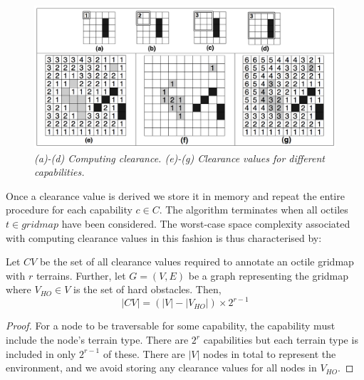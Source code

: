 \begin{figure}[htbp]
	\vspace{-9pt}
       \caption{\emph{(a)-(d) Computing clearance. (e)-(g) Clearance values for different capabilities.}}
       \begin{center}
                       \includegraphics[scale=0.20, trim = 20mm 9mm 20mm 0mm]{diagrams/annotations.png}
       \end{center}
       \label{aha-fig:annotations}
	\vspace{-6pt}
\end{figure}

Once a clearance value is derived we store it in memory and repeat the entire procedure for each capability $c \in C$.  
The algorithm terminates when all octiles $t \in gridmap$ have been considered. 
The worst-case space complexity associated with computing clearance values in this fashion is thus characterised by: 
\begin{lemma}
\label{aha-lemma:numannotations}
Let $CV$ be the set of all clearance values required to annotate an octile gridmap with $r$ terrains. Further, let $G = (V, E)$ be a graph representing the gridmap where $V_{HO} \in V$ is the set of hard obstacles. Then, 
$$|CV| = (|V| - |V_{HO}|)\times 2^{r-1}$$
\end{lemma}

\begin{proof}
For a node to be traversable for some capability, the capability must include the node's terrain type. 
There are $2^{r}$ capabilities but each terrain type is included in only $2^{r-1}$ of these. 
There are $|V|$ nodes in total to represent the environment, and we avoid storing any clearance values for all nodes in $V_{HO}$. 
\end{proof}

